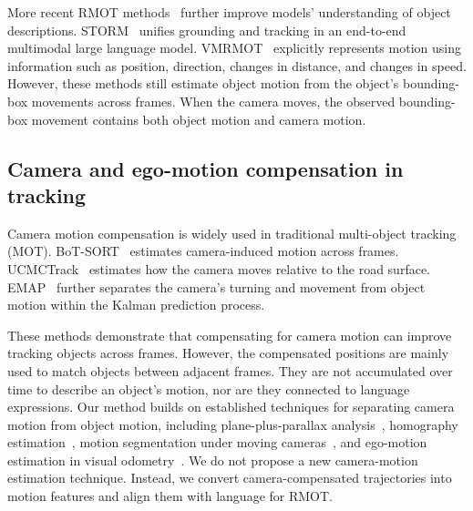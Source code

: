 \documentclass{article}
\begin{document}
More recent RMOT methods~\cite{deeprmot} further improve models' understanding of object descriptions. STORM~\cite{storm} unifies grounding and tracking in an end-to-end multimodal large language model. VMRMOT~\cite{vmrmot} explicitly represents motion using information such as position, direction, changes in distance, and changes in speed. However, these methods still estimate object motion from the object's bounding-box movements across frames. When the camera moves, the observed bounding-box movement contains both object motion and camera motion. %


\subsection{Camera and ego-motion compensation in tracking}
Camera motion compensation is widely used in traditional multi-object tracking (MOT). BoT-SORT~\cite{botsort} estimates camera-induced motion across frames. UCMCTrack~\cite{ucmctrack} estimates how the camera moves relative to the road surface. EMAP~\cite{emap} further separates the camera's turning and movement from object motion within the Kalman prediction process.

These methods demonstrate that compensating for camera motion can improve tracking objects across frames. However, the compensated positions are mainly used to match objects between adjacent frames. They are not accumulated over time to describe an object's motion, nor are they connected to language expressions. Our method builds on established techniques for separating camera motion from object motion, including plane-plus-parallax analysis~\cite{iranianandan}, homography estimation~\cite{hartleyzisserman}, motion segmentation under moving cameras~\cite{bideau}, and ego-motion estimation in visual odometry~\cite{scaramuzza}. We do not propose a new camera-motion estimation technique. Instead, we convert camera-compensated trajectories into motion features and align them with language for RMOT.
\end{document}
